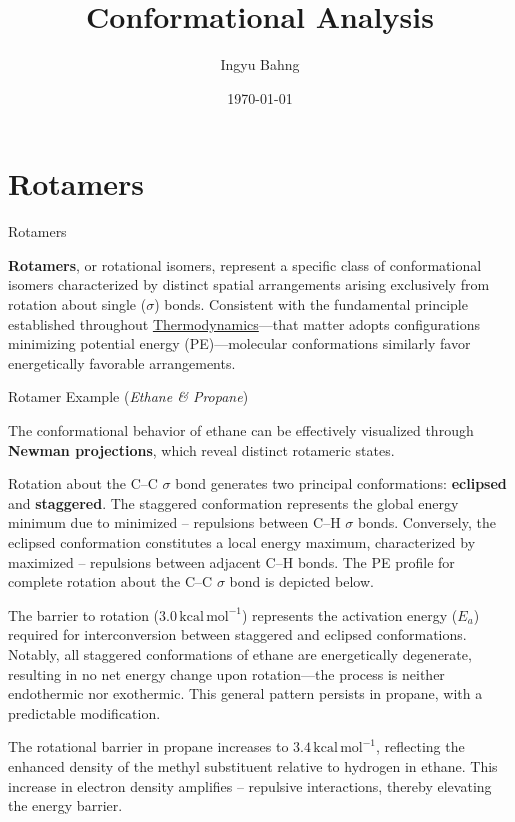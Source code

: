 \documentclass[10pt]{article}
\title{Conformational Analysis}
\date{\today}
\author{Ingyu Bahng}
\begin{document}


\section{Rotamers}

  \begin{core}{Rotamers}
 
    \textbf{Rotamers}, or rotational isomers, represent a specific class of conformational isomers characterized by distinct spatial arrangements arising exclusively from rotation about single ($\sigma$) bonds. Consistent with the fundamental principle established throughout \href{../thermodynamics/thermodynamics.pdf}{Thermodynamics}---that matter adopts configurations minimizing potential energy (PE)---molecular conformations similarly favor energetically favorable arrangements.

  \end{core}

  \begin{core}[label=core:rotamer_ethane]{Rotamer Example (\textit{Ethane \& Propane})}
      
    The conformational behavior of ethane can be effectively visualized through \textbf{Newman projections}, which reveal distinct rotameric states.


    Rotation about the C--C $\sigma$ bond generates two principal conformations: \textbf{eclipsed} and \textbf{staggered}. The staggered conformation represents the global energy minimum due to minimized -- repulsions between C--H $\sigma$ bonds. Conversely, the eclipsed conformation constitutes a local energy maximum, characterized by maximized -- repulsions between adjacent C--H bonds. The PE profile for complete rotation about the C--C $\sigma$ bond is depicted below.

    
    The barrier to rotation ($3.0\,\text{kcal}\,\text{mol}^{-1}$) represents the activation energy ($E_a$) required for interconversion between staggered and eclipsed conformations. Notably, all staggered conformations of ethane are energetically degenerate, resulting in no net energy change upon rotation---the process is neither endothermic nor exothermic. This general pattern persists in propane, with a predictable modification.

          
    The rotational barrier in propane increases to $3.4\,\text{kcal}\,\text{mol}^{-1}$, reflecting the enhanced  density of the methyl substituent relative to hydrogen in ethane. This increase in electron density amplifies -- repulsive interactions, thereby elevating the energy barrier.

  \end{core}
\end{document}
